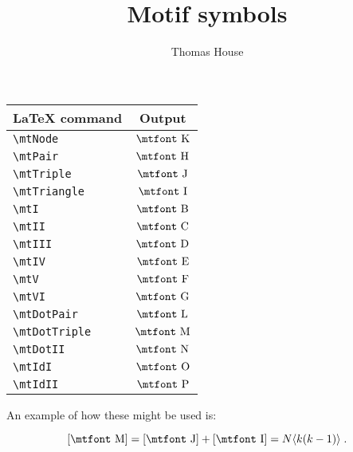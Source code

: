\documentclass[12pt,a4paper]{article}
\title{\sc Motif symbols}
\author{Thomas House}
\date{}
\newcommand{\mtI}{\mbox{\mtfont B}}
\newcommand{\mtII}{\mbox{\mtfont C}}
\newcommand{\mtIII}{\mbox{\mtfont D}}
\newcommand{\mtIV}{\mbox{\mtfont E}}
\newcommand{\mtV}{\mbox{\mtfont F}}
\newcommand{\mtVI}{\mbox{\mtfont G}}
\newcommand{\mtPair}{\mbox{\mtfont H}}
\newcommand{\mtTriangle}{\mbox{\mtfont I}}
\newcommand{\mtTriple}{\mbox{\mtfont J}}
\newcommand{\mtNode}{\mbox{\mtfont K}}
\newcommand{\mtDotPair}{\mbox{\mtfont L}}
\newcommand{\mtDotTriple}{\mbox{\mtfont M}}
\newcommand{\mtDotII}{\mbox{\mtfont N}}
\newcommand{\mtIdI}{\mbox{\mtfont O}}
\newcommand{\mtIdII}{\mbox{\mtfont P}}
\newcommand{\num}[1]{\left[ #1 \right]}
\begin{document}
\maketitle



\begin{center}
\begin{tabular}{l|c}
\LaTeX{} command & Output \\
 \hline
\verb!\mtNode! & $\mtNode$\\
\verb!\mtPair! & $\mtPair$\\
\verb!\mtTriple! & $\mtTriple$\\
\verb!\mtTriangle! & $\mtTriangle$\\
\verb!\mtI! & $\mtI$\\
\verb!\mtII! & $\mtII$\\
\verb!\mtIII! & $\mtIII$\\
\verb!\mtIV! & $\mtIV$\\
\verb!\mtV! & $\mtV$\\
\verb!\mtVI! & $\mtVI$\\
\verb!\mtDotPair! & $\mtDotPair$\\
\verb!\mtDotTriple! & $\mtDotTriple$\\
\verb!\mtDotII! & $\mtDotII$\\
\verb!\mtIdI! & $\mtIdI$\\
\verb!\mtIdII! & $\mtIdII$\\
\end{tabular}
\end{center}

An example of how these might be used is:

\begin{equation}
\num{\mtDotTriple} = \num{\mtTriple} + \num{\mtTriangle}  = N\langle k (k-1) \rangle \; . 
\end{equation}
\end{document}
